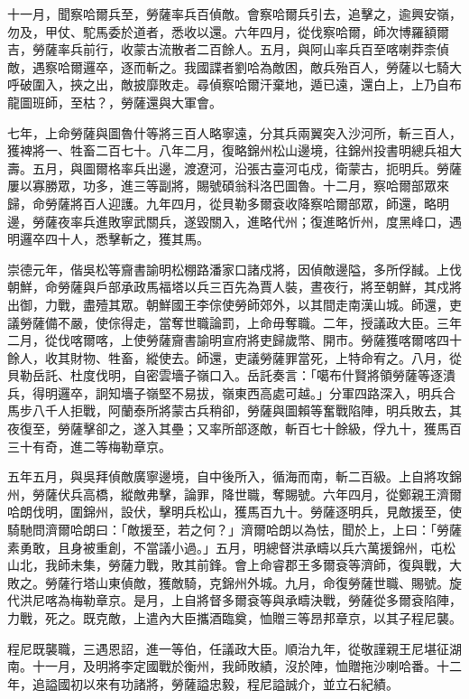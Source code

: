 \begin{pinyinscope}
十一月，聞察哈爾兵至，勞薩率兵百偵敵。會察哈爾兵引去，追擊之，逾興安嶺，勿及，甲仗、駝馬委於道者，悉收以還。六年四月，從伐察哈爾，師次博羅額爾吉，勞薩率兵前行，收蒙古流散者二百餘人。五月，與阿山率兵百至喀喇莽柰偵敵，遇察哈爾邏卒，逐而斬之。我國諜者劉哈為敵困，敵兵殆百人，勞薩以七騎大呼破圍入，挾之出，敵披靡敗走。尋偵察哈爾汗棄地，遁已遠，還白上，上乃自布龍圖班師，至枯？，勞薩還與大軍會。

七年，上命勞薩與圖魯什等將三百人略寧遠，分其兵兩翼突入沙河所，斬三百人，獲裨將一、牲畜二百七十。八年二月，復略錦州松山邊境，往錦州投書明總兵祖大壽。五月，與圖爾格率兵出邊，渡遼河，沿張古臺河屯戍，衛蒙古，扼明兵。勞薩屢以寡勝眾，功多，進三等副將，賜號碩翁科洛巴圖魯。十二月，察哈爾部眾來歸，命勞薩將百人迎護。九年四月，從貝勒多爾袞收降察哈爾部眾，師還，略明邊，勞薩夜率兵進敗寧武關兵，遂毀關入，進略代州；復進略忻州，度黑峰口，遇明邏卒四十人，悉擊斬之，獲其馬。

崇德元年，偕吳松等齎書諭明松棚路潘家口諸戍將，因偵敵邊隘，多所俘馘。上伐朝鮮，命勞薩與戶部承政馬福塔以兵三百先為賈人裝，晝夜行，將至朝鮮，其戍將出御，力戰，盡殪其眾。朝鮮國王李倧使勞師郊外，以其間走南漢山城。師還，吏議勞薩備不嚴，使倧得走，當奪世職論罰，上命毋奪職。二年，授議政大臣。三年二月，從伐喀爾喀，上使勞薩齎書諭明宣府將吏歸歲幣、開巿。勞薩獲喀爾喀四十餘人，收其財物、牲畜，縱使去。師還，吏議勞薩罪當死，上特命宥之。八月，從貝勒岳託、杜度伐明，自密雲墻子嶺口入。岳託奏言：「噶布什賢將領勞薩等逐潰兵，得明邏卒，詗知墻子嶺堅不易拔，嶺東西高處可越。」分軍四路深入，明兵合馬步八千人拒戰，阿蘭泰所將蒙古兵稍卻，勞薩與圖賴等奮戰陷陣，明兵敗去，其夜復至，勞薩擊卻之，遂入其壘；又率所部逐敵，斬百七十餘級，俘九十，獲馬百三十有奇，進二等梅勒章京。

五年五月，與吳拜偵敵廣寧邊境，自中後所入，循海而南，斬二百級。上自將攻錦州，勞薩伏兵高橋，縱敵弗擊，論罪，降世職，奪賜號。六年四月，從鄭親王濟爾哈朗伐明，圍錦州，設伏，擊明兵松山，獲馬百九十。勞薩逐明兵，見敵援至，使騎馳問濟爾哈朗曰：「敵援至，若之何？」濟爾哈朗以為怯，聞於上，上曰：「勞薩素勇敢，且身被重創，不當議小過。」五月，明總督洪承疇以兵六萬援錦州，屯松山北，我師未集，勞薩力戰，敗其前鋒。會上命睿郡王多爾袞等濟師，復與戰，大敗之。勞薩行塔山東偵敵，獲敵騎，克錦州外城。九月，命復勞薩世職、賜號。旋代洪尼喀為梅勒章京。是月，上自將督多爾袞等與承疇決戰，勞薩從多爾袞陷陣，力戰，死之。既克敵，上遣內大臣攜酒臨奠，恤贈三等昂邦章京，以其子程尼襲。

程尼既襲職，三遇恩詔，進一等伯，任議政大臣。順治九年，從敬謹親王尼堪征湖南。十一月，及明將李定國戰於衡州，我師敗績，沒於陣，恤贈拖沙喇哈番。十二年，追謚國初以來有功諸將，勞薩謚忠毅，程尼謚誠介，並立石紀績。


\end{pinyinscope}
